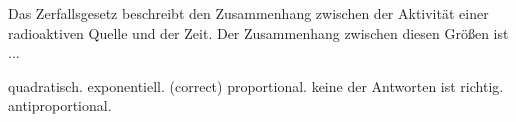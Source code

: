 \documentclass[11pt]{exam}
\begin{document}
\begin{questions}
\vspace{3mm}\question Das Zerfallsgesetz beschreibt den Zusammenhang zwischen der Aktivität einer radioaktiven Quelle und der Zeit. Der Zusammenhang zwischen diesen Größen ist ...

\begin{choices}
	\choice quadratisch.
	\choice exponentiell. (correct)
	\choice proportional.
	\choice keine der Antworten ist richtig.
	\choice antiproportional.
\end{choices}

\vspace{3mm}\end{questions}
\end{document}
